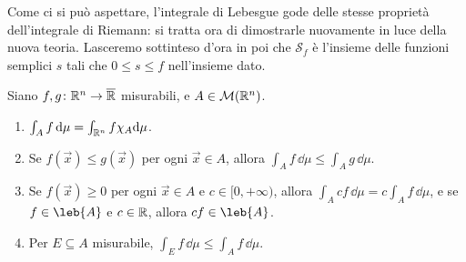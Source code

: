 Come ci si può aspettare, l'integrale di Lebesgue gode delle stesse proprietà dell'integrale di Riemann: si tratta ora di dimostrarle nuovamente in luce della nuova teoria.
Lasceremo sottinteso d'ora in poi che $\mathcal S_f$ è l'insieme delle funzioni semplici $s$ tali che $0\leq s\leq f$ nell'insieme dato.
\begin{proprieta} \label{pr:integrale-lebesgue}
	Siano $f,g\colon\mathbb{R}^n\to\overline{\mathbb{R}}$ misurabili, e $A\in\mathcal M(\mathbb{R}^n)$.
	\begin{enumerate}
		\item $\int_Af\,\textup{d}\mu=\int_{\mathbb{R}^n}f\chi_A\textup{d}\mu$.
		\item Se $f(\vec x)\leq g(\vec x)$ per ogni $\vec x\in A$, allora $\int_A f\,\dd\mu\leq\int_Ag\,\dd\mu$.
		\item Se $f(\vec x)\geq 0$ per ogni $\vec x\in A$ e $c\in[0,+\infty)$, allora $\int_Acf\,\dd\mu=c\int_Af\,\dd\mu$, e se $f\in\leb{A}$ e $c\in\mathbb{R}$, allora $cf\in\leb{A}$.
		\item Per $E\subseteq A$ misurabile, $\int_Ef\,\dd\mu\leq\int_Af\,\dd\mu$.
	\end{enumerate}
\end{proprieta}
